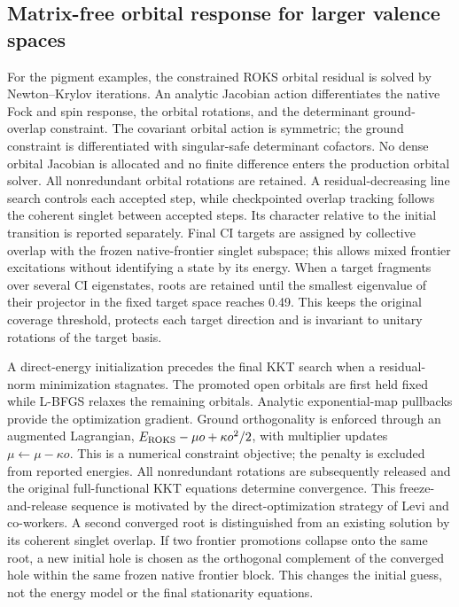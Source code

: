 \documentclass[11pt,a4paper]{article}
\begin{document}
\subsection{Matrix-free orbital response for larger valence spaces}
For the pigment examples, the constrained ROKS orbital residual is solved
by Newton--Krylov iterations. An analytic Jacobian action differentiates the
native Fock and spin response, the orbital rotations, and the determinant
ground-overlap constraint. The covariant orbital action is symmetric; the
ground constraint is differentiated with singular-safe determinant
cofactors. No dense orbital Jacobian is allocated and no finite difference
enters the production orbital solver. All nonredundant orbital rotations
are retained. A residual-decreasing line search controls each accepted
step, while checkpointed overlap tracking follows the coherent singlet
between accepted steps. Its character relative to the initial transition
is reported separately. Final CI targets are assigned by collective
overlap with the frozen native-frontier singlet subspace; this allows
mixed frontier excitations without identifying a state by its energy.
When a target fragments over several CI eigenstates, roots are retained
until the smallest eigenvalue of their projector in the fixed target space
reaches 0.49. This keeps the original coverage threshold, protects each
target direction and is invariant to unitary rotations of the target basis.

A direct-energy initialization precedes the final KKT search when a
residual-norm minimization stagnates. The promoted open orbitals are
first held fixed while L-BFGS relaxes the remaining orbitals. Analytic
exponential-map pullbacks provide the optimization gradient. Ground
orthogonality is enforced through an augmented Lagrangian,
$E_{\rm ROKS}-\mu o+\kappa o^2/2$, with multiplier updates
$\mu\leftarrow\mu-\kappa o$. This is a numerical constraint objective;
the penalty is excluded from reported energies. All nonredundant
rotations are subsequently released and the original full-functional
KKT equations determine convergence. This freeze-and-release sequence
is motivated by the direct-optimization strategy of Levi and
co-workers.\cite{freeze2026} A second converged root is distinguished
from an existing solution by its coherent singlet overlap. If two
frontier promotions collapse onto the same root, a new initial hole
is chosen as the orthogonal complement of the converged hole within
the same frozen native frontier block. This changes the initial guess,
not the energy model or the final stationarity equations.
\end{document}
